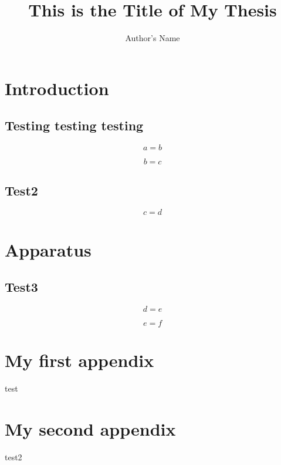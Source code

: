\documentclass[12pt,english,linenumber]{thesis}
\title{This is the Title of My Thesis}
\author{Author's Name}
\begin{document}
\maketitle

\frontmatter


\chapter{Introduction}


\section{Testing testing testing}

\begin{equation}
a=b\label{eq:}\end{equation}


\begin{equation}
b=c\label{eq:}\end{equation}



\section{Test2}


\begin{equation}
c=d\label{eq:}\end{equation}



\chapter{Apparatus}


\section{Test3}

\begin{equation}
d=e\label{eq:}\end{equation}


\begin{equation}
e=f\label{eq:}\end{equation}


\clearpage



\uofsappendix

\begin{appendices}
\chapter{My first appendix}
test

\chapter{My second appendix}
test2
\end{appendices}
 
\end{document}
